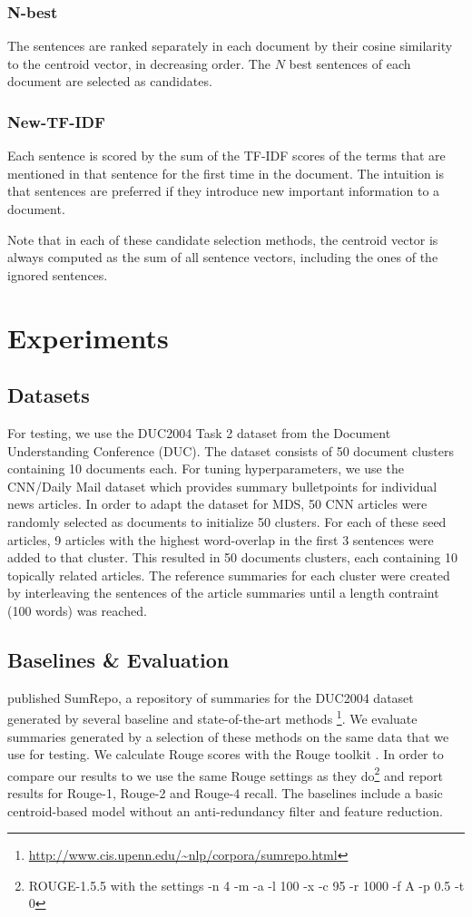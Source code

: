 \documentclass[11pt,letterpaper]{article}
\begin{document}
\subsubsection*{N-best}
The sentences are ranked separately in each document by their cosine similarity to the centroid vector, in decreasing order. The $N$ best sentences of each document are selected as candidates.
\subsubsection*{New-TF-IDF}
Each sentence is scored by the sum of the TF-IDF scores of the terms that are mentioned in that sentence for the first time in the document. The intuition is that sentences are preferred if they introduce new important information to a document.

Note that in each of these candidate selection methods, the centroid vector is always computed as the sum of all sentence vectors, including the ones of the ignored sentences.
\section{Experiments}
\subsection*{Datasets}
For testing, we use the DUC2004 Task 2 dataset from the Document Understanding Conference (DUC). The dataset consists of 50 document clusters containing 10 documents each. 
For tuning hyperparameters, we use the CNN/Daily Mail dataset \cite{hermann2015teaching} which provides summary bulletpoints for individual news articles.
In order to adapt the dataset for MDS, 50 CNN articles were randomly selected as documents to initialize 50 clusters. For each of these seed articles, 9 articles with the highest word-overlap in the first 3 sentences were added to that cluster. This resulted in 50 documents clusters, each containing 10 topically related articles. The reference summaries for each cluster were created by interleaving the sentences of the article summaries until a length contraint (100 words) was reached.
\subsection*{Baselines \& Evaluation}
 \citet{hong2014repository} published SumRepo, a repository of summaries for the DUC2004 dataset generated by several baseline and state-of-the-art methods \footnote{\url{http://www.cis.upenn.edu/~nlp/corpora/sumrepo.html}}. We evaluate summaries generated by a selection of these methods on the same data that we use for testing. We calculate Rouge scores with the Rouge toolkit \cite{lin2004rouge}. In order to compare our results to \citet{hong2014repository} we use the same Rouge settings as they do\footnote{ROUGE-1.5.5 with the settings -n 4 -m -a -l 100 -x -c 95 -r 1000 -f A -p 0.5 -t 0} and report results for Rouge-1, Rouge-2 and Rouge-4 recall. The baselines include a basic centroid-based model without an anti-redundancy filter and feature reduction.
\end{document}

